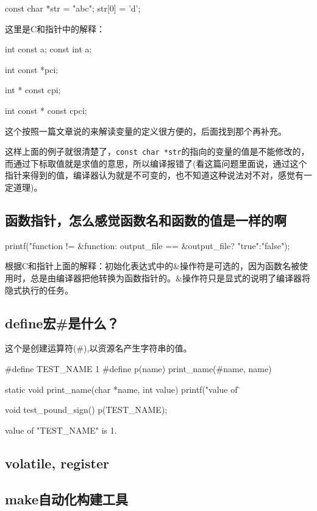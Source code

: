 \begin{C}[为什么这样会有编译错误呢？]
const char *str = "abc";
str[0] = 'd';
\end{C}

这里是C和指针中的解释：

\begin{C}
int const a;
const int a;
\end{C}


\begin{C}
int const *pci;
\end{C}

\begin{C}
int * const cpi;
\end{C}

\begin{C}[这个指针和值都不能修改]
int const * const cpci;
\end{C}

这个按照一篇文章说的来解读变量的定义很方便的，后面找到那个再补充。


这样上面的例子就很清楚了，\lstinline$const char *str$的指向的变量的值是不能修改的，而通过下标取值就是求值的意思，所以编译报错了(看这篇问题里面说，通过这个指针来得到的值，编译器认为就是不可变的，也不知道这种说法对不对，感觉有一定道理)。

\subsection{函数指针，怎么感觉函数名和函数的值是一样的啊}

\begin{C}[这是我不能理解的]
printf("function != &function:%
	output_file == &output_file? "true":"false");
\end{C}

根据C和指针上面的解释：初始化表达式中的\&操作符是可选的，因为函数名被使用时，总是由编译器把他转换为函数指针的。\&操作符只是显式的说明了编译器将隐式执行的任务。

\subsection{define宏\#是什么？}

这个是创建运算符(\#),以资源名产生字符串的值。

\begin{C}
#define TEST_NAME 1
#define p(name) print_name(#name, name)

static void print_name(char *name, int value)
{
	printf("value of \"%
}

void test_pound_sign()
{
	p(TEST_NAME);
}
\end{C}

\begin{Command-Line}[运行结果]
value of "TEST_NAME" is 1.
\end{Command-Line}

\subsection{volatile, register}


\subsection{make自动化构建工具}

